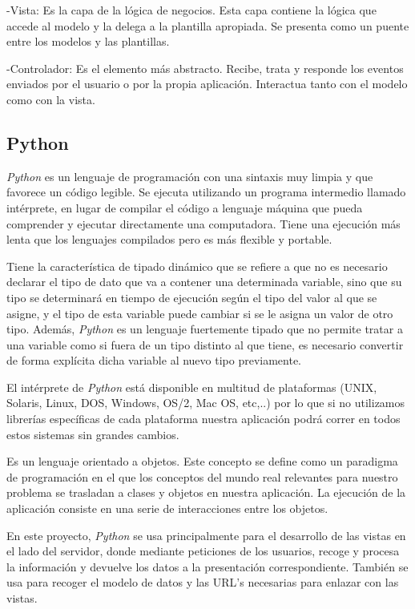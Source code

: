 \documentclass[a4paper, 12pt]{book}
\begin{document}
-Vista: Es la capa de la l\'ogica de negocios. Esta capa contiene la l\'ogica que accede al modelo y la delega a la plantilla apropiada. Se presenta 
como un puente entre los modelos y las plantillas.

-Controlador: Es el elemento m\'as abstracto. Recibe, trata y responde los eventos enviados por el usuario o por la propia aplicaci\'on. Interactua 
tanto con el modelo como con la vista.



\subsection{Python} 
\label{subsec:python}
\textit{Python} es un lenguaje de programaci\'on con una sintaxis muy limpia y que favorece un c\'odigo legible. Se ejecuta utilizando un programa intermedio 
llamado int\'erprete, en lugar de compilar el c\'odigo a lenguaje m\'aquina que pueda comprender
y ejecutar directamente una computadora. Tiene una ejecuci\'on m\'as lenta que los lenguajes compilados pero es m\'as flexible y portable.

Tiene la caracter\'istica de tipado din\'amico que se refiere a que no es necesario declarar el tipo de dato que va a contener una determinada 
variable, sino que su tipo se determinar\'a en tiempo de ejecuci\'on seg\'un el tipo del valor al que se asigne, y el tipo de esta variable puede 
cambiar si se le asigna un valor de otro tipo. Adem\'as, \textit{Python} es un lenguaje fuertemente tipado que no permite tratar a una variable como si fuera 
de un tipo distinto al que tiene, es necesario convertir de forma expl\'icita dicha variable al nuevo tipo previamente. 

El int\'erprete de \textit{Python} est\'a disponible en multitud de plataformas (UNIX, Solaris, Linux, DOS, Windows, OS/2, Mac OS, etc,..) 
por lo que si no utilizamos librer\'ias espec\'ificas de cada plataforma nuestra aplicaci\'on podr\'a correr en todos estos sistemas sin grandes 
cambios.

Es un lenguaje orientado a objetos. Este concepto se define como un paradigma de programaci\'on en el que los conceptos del mundo real relevantes 
para nuestro problema se trasladan a clases y objetos en nuestra aplicaci\'on. La ejecuci\'on de la aplicaci\'on consiste en una serie de interacciones 
entre los objetos.

En este proyecto, \textit{Python} se usa principalmente para el desarrollo de las vistas en el lado del servidor, donde mediante 
peticiones de los usuarios, recoge y procesa la informaci\'on y devuelve los datos a la presentaci\'on correspondiente. Tambi\'en se usa para recoger el 
modelo de datos y las URL's necesarias para enlazar con las vistas.
\end{document}
